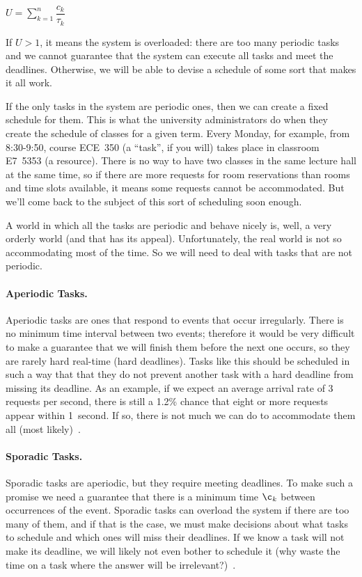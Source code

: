 \begin{center}
$U = \sum\limits_{k=1}^n\dfrac{c_{k}}{\tau_{k}}$
\end{center}

If $U > 1$, it means the system is overloaded: there are too many periodic tasks and we cannot guarantee that the system can execute all tasks and meet the deadlines. Otherwise, we will be able to devise a schedule of some sort that makes it all work.

If the only tasks in the system are periodic ones, then we can create a fixed schedule for them. This is what the university administrators do when they create the schedule of classes for a given term. Every Monday, for example, from 8:30-9:50, course ECE~350 (a ``task'', if you will) takes place in classroom E7~5353 (a resource). There is no way to have two classes in the same lecture hall at the same time, so if there are more requests for room reservations than rooms and time slots available, it means some requests cannot be accommodated. But we'll come back to the subject of this sort of scheduling soon enough.

A world in which all the tasks are periodic and behave nicely is, well, a very orderly world (and that has its appeal). Unfortunately, the real world is not so accommodating most of the time. So we will need to deal with tasks that are not periodic.

\paragraph{Aperiodic Tasks.}
Aperiodic tasks are ones that respond to events that occur irregularly. There is no minimum time interval between two events; therefore it would be very difficult to make a guarantee that we will finish them before the next one occurs, so they are rarely hard real-time (hard deadlines). Tasks like this should be scheduled in such a way that that they do not prevent another task with a hard deadline from missing its deadline. As an example, if we expect an average arrival rate of 3 requests per second, there is still a 1.2\% chance that eight or more requests appear within 1~second. If so, there is not much we can do to accommodate them all (most likely)~\cite{mte241}.

\paragraph{Sporadic Tasks.}
Sporadic tasks are aperiodic, but they require meeting deadlines. To make such a promise we need a guarantee that there is a minimum time $\c_{k}$ between occurrences of the event. Sporadic tasks can overload the system if there are too many of them, and if that is the case, we must make decisions about what tasks to schedule and which ones will miss their deadlines. If we know a task will not make its deadline, we will likely not even bother to schedule it (why waste the time on a task where the answer will be irrelevant?)~\cite{mte241}.

